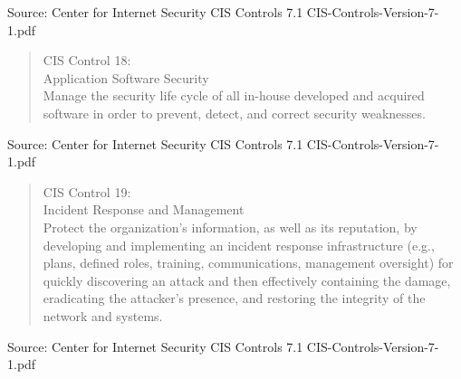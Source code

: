 \documentclass[Screen16to9,17pt]{foils}
\begin{document}
\begin{list1}
\item
\item
\end{list1}

Source: Center for Internet Security CIS Controls 7.1 CIS-Controls-Version-7-1.pdf


\begin{quote}
CIS Control 18:\\
Application Software Security\\
Manage the security life cycle of all in-house developed and acquired software in order to prevent, detect, and correct security weaknesses.
\end{quote}

\begin{list1}
\item
\item
\item
\item
\end{list1}

Source: Center for Internet Security CIS Controls 7.1 CIS-Controls-Version-7-1.pdf


\begin{quote}
CIS Control 19:\\
Incident Response and Management\\
Protect the organization’s information, as well as its reputation, by developing and implementing an incident response infrastructure (e.g., plans, defined roles, training, communications, management oversight) for quickly discovering an attack and then effectively containing the damage, eradicating the attacker’s presence, and restoring the integrity of the network and systems.
\end{quote}

\begin{list1}
\item
\item
\item
\item
\end{list1}

Source: Center for Internet Security CIS Controls 7.1 CIS-Controls-Version-7-1.pdf

\end{document}
